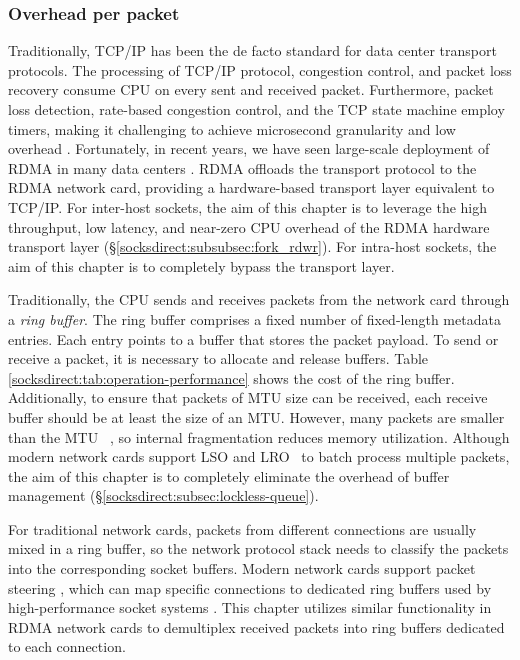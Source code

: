\subsubsection{Overhead per packet}
\label{socksdirect:subsec:per-packet-overhead}

Traditionally, TCP/IP has been the de facto standard for data center transport protocols.
The processing of TCP/IP protocol, congestion control, and packet loss recovery consume CPU on every sent and received packet.
Furthermore, packet loss detection, rate-based congestion control, and the TCP state machine employ timers, making it challenging to achieve microsecond granularity and low overhead \cite{jeong2014mtcp}.
Fortunately, in recent years, we have seen large-scale deployment of RDMA in many data centers \cite {guo2016rdma,zhu2015congestion,mittal2015timely}.
RDMA offloads the transport protocol to the RDMA network card, providing a hardware-based transport layer equivalent to TCP/IP.
For inter-host sockets, the aim of this chapter is to leverage the high throughput, low latency, and near-zero CPU overhead of the RDMA hardware transport layer (\S\ref{socksdirect:subsubsec:fork_rdwr}).
For intra-host sockets, the aim of this chapter is to completely bypass the transport layer.

Traditionally, the CPU sends and receives packets from the network card through a \emph {ring buffer}.
The ring buffer comprises a fixed number of fixed-length metadata entries.
Each entry points to a buffer that stores the packet payload.
To send or receive a packet, it is necessary to allocate and release buffers.
Table \ref {socksdirect:tab:operation-performance} shows the cost of the ring buffer.
Additionally, to ensure that packets of MTU size can be received, each receive buffer should be at least the size of an MTU.
However, many packets are smaller than the MTU~ \cite {thompson1997wide}, so internal fragmentation reduces memory utilization.
Although modern network cards support LSO and LRO~ \cite {lsolro} to batch process multiple packets, the aim of this chapter is to completely eliminate the overhead of buffer management (\S\ref{socksdirect:subsec:lockless-queue}).

For traditional network cards, packets from different connections are usually mixed in a ring buffer, so the network protocol stack needs to classify the packets into the corresponding socket buffers. Modern network cards support packet steering \cite {mellanox}, which can map specific connections to dedicated ring buffers used by high-performance socket systems \cite {jeong2014mtcp,lin2016scalable,libvma}. This chapter utilizes similar functionality in RDMA network cards to demultiplex received packets into ring buffers dedicated to each connection.

